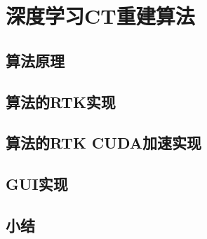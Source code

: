 \chapter{深度学习CT重建算法}


\section{算法原理}
\section{算法的RTK实现}
\section{算法的RTK CUDA加速实现}
\section{GUI实现}

\section{小结}


